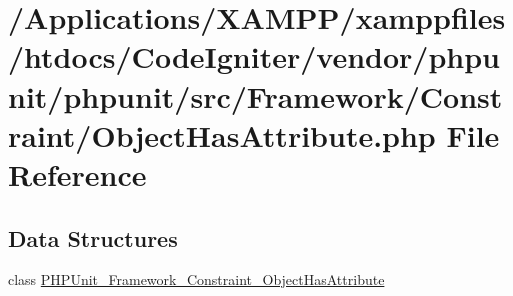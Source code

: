 \hypertarget{_object_has_attribute_8php}{}\section{/\+Applications/\+X\+A\+M\+P\+P/xamppfiles/htdocs/\+Code\+Igniter/vendor/phpunit/phpunit/src/\+Framework/\+Constraint/\+Object\+Has\+Attribute.php File Reference}
\label{_object_has_attribute_8php}
\subsection*{Data Structures}
\begin{DoxyCompactItemize}
\item 
class \mbox{\hyperlink{class_p_h_p_unit___framework___constraint___object_has_attribute}{P\+H\+P\+Unit\+\_\+\+Framework\+\_\+\+Constraint\+\_\+\+Object\+Has\+Attribute}}
\end{DoxyCompactItemize}
